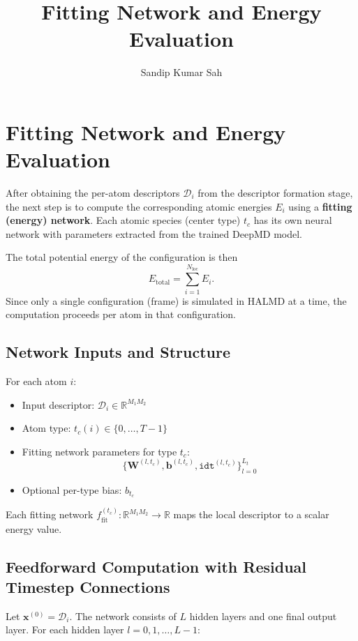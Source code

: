 \documentclass[12pt,a4paper]{article}
\title{Fitting Network and Energy Evaluation}
\author{Sandip Kumar Sah}
\date{}
\begin{document}
\maketitle

\section*{Fitting Network and Energy Evaluation}

After obtaining the per-atom descriptors $\bm{\mathcal{D}}_i$ from the descriptor formation stage, 
the next step is to compute the corresponding atomic energies $E_i$ using a 
\textbf{fitting (energy) network}. 
Each atomic species (center type) $t_c$ has its own neural network with parameters extracted from the trained DeepMD model.

The total potential energy of the configuration is then
\[
E_{\text{total}} = \sum_{i=1}^{N_{\mathrm{loc}}} E_i.
\]
Since only a single configuration (frame) is simulated in HALMD at a time, the computation proceeds per atom in that configuration.

\subsection*{Network Inputs and Structure}

For each atom $i$:
\begin{itemize}
  \item Input descriptor: $\bm{\mathcal{D}}_i \in \mathbb{R}^{M_1 M_2}$
  \item Atom type: $t_c(i) \in \{0, \dots, T-1\}$
  \item Fitting network parameters for type $t_c$: 
  \[
  \{\mathbf{W}^{(l,t_c)}, \mathbf{b}^{(l,t_c)}, \texttt{idt}^{(l,t_c)}\}_{l=0}^{L_t}
  \]
  \item Optional per-type bias: $b_{t_c}$
\end{itemize}

Each fitting network $f_{\text{fit}}^{(t_c)}: \mathbb{R}^{M_1 M_2} \rightarrow \mathbb{R}$ maps the local descriptor to a scalar energy value.

\subsection*{Feedforward Computation with Residual Timestep Connections}

Let $\mathbf{x}^{(0)} = \bm{\mathcal{D}}_i$.  
The network consists of $L$ hidden layers and one final output layer.  
For each hidden layer $l = 0, 1, \dots, L-1$:
\end{document}
